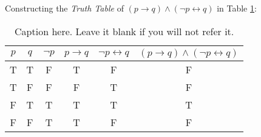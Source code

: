 \documentclass[12pt,letterpaper]{article}
\begin{document}
Constructing the \emph{Truth Table} of $(p \rightarrow q) \wedge (\neg p \leftrightarrow q)$ in Table \ref{tb_truth_table}:

\begin{table}[h]    %
\caption{Caption here. Leave it blank if you will not refer it.}
\label{tb_truth_table}
    \centering  %
    \begin{tabular}{cc|c|cc|c} %

        $p$ &   $q$ &   $\neg p$    &   $p \rightarrow q$  &   $\neg p \leftrightarrow q$  &   $(p \rightarrow q) \wedge (\neg p \leftrightarrow q)$ \\ \hline
        T   &   T   &   F           &   T                   &   F                           &   F   \\
        T   &   F   &   F           &   F                   &   T                           &   F   \\
        F   &   T   &   T           &   T                   &   T                           &   T   \\
        F   &   F   &   T           &   T                   &   F                           &   F
    \end{tabular}
\end{table}
\end{document}
